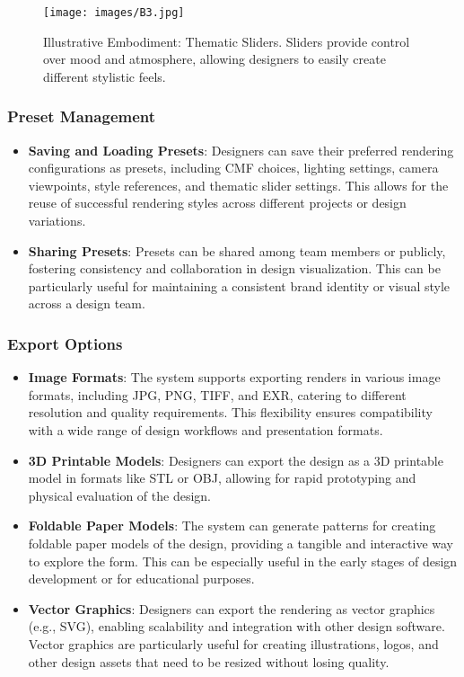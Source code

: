 \documentclass{article}
\begin{document}
\begin{figure}
\centering
\texttt{[image: images/B3.jpg]}
\caption{Illustrative Embodiment: Thematic Sliders. Sliders provide control over mood and atmosphere, allowing designers to easily create different stylistic feels.}
\label{fig:thematic-sliders}
\end{figure}

\subsubsection{Preset Management}
\begin{itemize}
\item \textbf{Saving and Loading Presets}: Designers can save their preferred rendering configurations as presets, including CMF choices, lighting settings, camera viewpoints, style references, and thematic slider settings. This allows for the reuse of successful rendering styles across different projects or design variations.
\item \textbf{Sharing Presets}: Presets can be shared among team members or publicly, fostering consistency and collaboration in design visualization. This can be particularly useful for maintaining a consistent brand identity or visual style across a design team.
\end{itemize}

\subsubsection{Export Options}
\begin{itemize}
\item \textbf{Image Formats}: The system supports exporting renders in various image formats, including JPG, PNG, TIFF, and EXR, catering to different resolution and quality requirements. This flexibility ensures compatibility with a wide range of design workflows and presentation formats.
\item \textbf{3D Printable Models}: Designers can export the design as a 3D printable model in formats like STL or OBJ, allowing for rapid prototyping and physical evaluation of the design.
\item \textbf{Foldable Paper Models}: The system can generate patterns for creating foldable paper models of the design, providing a tangible and interactive way to explore the form. This can be especially useful in the early stages of design development or for educational purposes.
\item \textbf{Vector Graphics}: Designers can export the rendering as vector graphics (e.g., SVG), enabling scalability and integration with other design software. Vector graphics are particularly useful for creating illustrations, logos, and other design assets that need to be resized without losing quality.
\end{itemize}
\end{document}
